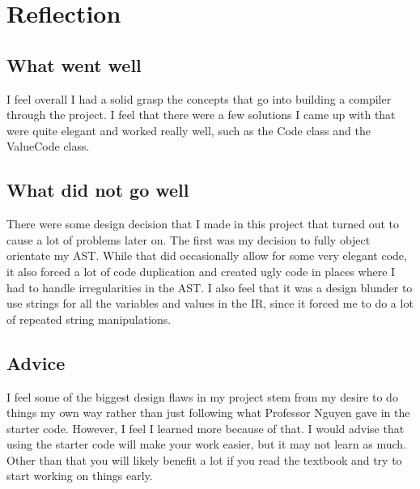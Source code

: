 \newpage
\section*{Reflection}

\subsection*{What went well}
I feel overall I had a solid grasp the concepts that go into building a compiler through the project. I feel that there were a few solutions I came up with that were quite elegant and worked really well, such as the Code class and the ValueCode class. 

\subsection*{What did not go well}
There were some design decision that I made in this project that turned out to cause a lot of problems later on. The first was my decision to fully object orientate my AST. While that did occasionally allow for some very elegant code, it also forced a lot of code duplication and created ugly code in places where I had to handle irregularities in the AST. I also feel that it was a design blunder to use strings for all the variables and values in the IR, since it forced me to do a lot of repeated string manipulations. 

\subsection*{Advice}
I feel some of the biggest design flaws in my project stem from my desire to do things my own way rather than just following what Professor Nguyen gave in the starter code. However, I feel I learned more because of that. I would advise that using the starter code will make your work easier, but it may not learn as much. Other than that you will likely benefit a lot if you read the textbook and try to start working on things early. 
